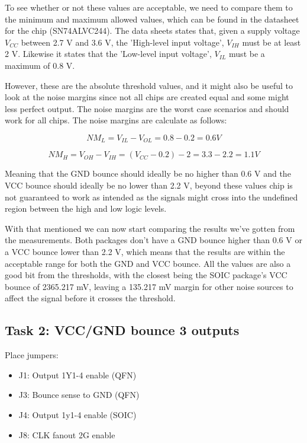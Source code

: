 \documentclass[../main.tex]{subfiles}
\begin{document}
To see whether or not these values are acceptable, we need to compare them to the minimum and maximum allowed values, which can be found in the datasheet for the chip (SN74ALVC244). The data sheets states that, given a supply voltage $V_{CC}$ between 2.7 V and 3.6 V, the 'High-level input voltage', $V_{IH}$ must be at least 2 V. Likewise it states that the 'Low-level input voltage', $V_{IL}$ must be a maximum of 0.8 V. 

However, these are the absolute threshold values, and it might also be useful to look at the noise margins since not all chips are created equal and some might less perfect output. The noise margins are the worst case scenarios and should work for all chips. The noise margins are calculate as follows:

\begin{equation*}
    NM_{L} = V_{IL} - V_{OL} = 0.8 - 0.2 = 0.6 V
\end{equation*}

\begin{equation*}
    NM_{H} = V_{OH} - V_{IH} = (V_{CC} - 0.2) - 2 = 3.3 - 2.2 = 1.1 V
\end{equation*}

Meaning that the GND bounce should ideally be no higher than 0.6 V and the VCC bounce should ideally be no lower than 2.2 V, beyond these values chip is not guaranteed to work as intended as the signals might cross into the undefined region between the high and low logic levels.

\vspace{10pt}

With that mentioned we can now start comparing the results we've gotten from the measurements. Both packages don't have a GND bounce higher than 0.6 V or a VCC bounce lower than 2.2 V, which means that the results are within the acceptable range for both the GND and VCC bounce. All the values are also a good bit from the thresholds, with the closest being the SOIC package's VCC bounce of 2365.217 mV, leaving a 135.217 mV margin for other noise sources to affect the signal before it crosses the threshold.

\subsection{Task 2: VCC/GND bounce 3 outputs}

Place jumpers:

\begin{itemize}
    \item J1: Output 1Y1-4 enable (QFN)
    \item J3: Bounce sense to GND (QFN)
    \item J4: Output 1y1-4 enable (SOIC)
    \item J8: CLK fanout 2G enable
\end{itemize}
\end{document}
